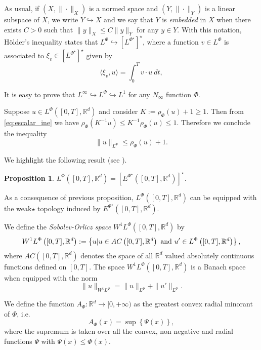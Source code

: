 \documentclass[twoside]{article}
\newtheorem{prop}[thm]{Proposition}
\theoremstyle{remark}
\newcommand{\orlnor}{\|_{L^{\Phi}}}
\newcommand{\lphi}{L^{\Phi}}
\newcommand{\lpsi}{L^{\Phi^{\star}}}
\newcommand{\wphi}{W^{1}\lphi}
\newcommand{\rr}{\mathbb{R}}
\renewcommand{\leq}{\leqslant}
\renewcommand{\geq}{\geqslant}
\newcommand{\epsi}{E^{\Phi^{\star}}}
\begin{document}
As usual, if $(X,\|\cdot\|_X)$ is a normed space and $(Y,\|\cdot \|_Y)$ is a linear subspace of $X$,  we write $Y\hookrightarrow X$ and we say that $Y$ is \emph{embedded} in $X$  when there exists $C>0$ such that
$\|y\|_X\leq C\|y\|_Y$ for any $y\in Y$.  With this notation, H\"older's inequality states that  $\lphi\hookrightarrow  \left[\lpsi\right]^\star$, where a function $v\in\lphi$ is associated  to $\xi_v\in \left[\lpsi\right]^\star$ given by
\begin{equation}\label{pairing}
  \langle \xi_v,u\rangle=\int_0^Tv\cdot u\ dt,
\end{equation}

It is easy to prove that $L^{\infty} \hookrightarrow L^\Phi\hookrightarrow L^1$ for any $N_{\infty}$ function $\Phi$.

Suppose $u\in\lphi([0,T],\rr^d)$ and consider $K:=\rho_{\Phi}(u)+1\geq 1$. Then from \eqref{eq:escalar_ine} we have $\rho_{\Phi}(K^{-1}u)\leq K^{-1}\rho_{\Phi}(u)\leq 1$. Therefore we conclude the inequality
\begin{equation}\label{eq:amemiya}
 \|u\orlnor \leq \rho_{\Phi}(u)+1.
\end{equation}



We highlight the following result (see \cite[Th. 3.3]{gwiazda2013anisotropic}).

\begin{prop} $\lphi\left([0,T],\rr^d\right)=\left[\epsi\left([0,T],\rr^d\right)\right]^{\star}$.
 
\end{prop}


As a consequence of previous proposition,  $\lphi\left([0,T],\rr^d\right)$ can be equipped with the weak$\star$ topology induced by $\epsi\left([0,T],\rr^d\right)$.



We define the \emph{Sobolev-Orlicz space} $\wphi\left([0,T],\rr^d\right)$ by
\[\wphi\left([0,T],\rr^d\right):=\left\{u| u\in AC\left([0,T],\rr^d\right) \hbox{ and } u'\in \lphi\left([0,T],\rr^d\right)\right\},\]
where $AC\left([0,T],\rr^d\right)$ denotes the space of all $\rr^d$ valued absolutely continuous functions defined on $[0,T]$. The space $\wphi\left([0,T],\rr^d\right)$ is a Banach space when equipped with the norm
\begin{equation}\label{def-norma-orlicz-sob}
\|  u  \|_{\wphi}= \|  u  \|_{\lphi} + \|u'\orlnor.
\end{equation}


We define the function $A_{\Phi}:\rr^d\to [0,+\infty)$ as the greatest convex radial minorant of $\Phi$, i.e.
\begin{equation}\label{eq:inversa-gral}
A_{\Phi}(x)=\sup\left\{\Psi(x) \right\},
\end{equation}
where the supremum is taken over all the convex, non negative and radial functions $\Psi$ with $\Psi(x)\leq \Phi(x)$.
\end{document}
